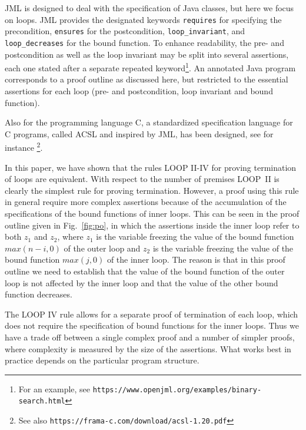 \documentclass[runningheads]{llncs}       %
\begin{document}
JML is designed to deal with the specification of Java classes,
but here we focus on loops.
JML provides the designated keywords 
\texttt{requires} for specifying the precondition,
\texttt{ensures} for the postcondition,
\texttt{loop\_invariant}, and 
\texttt{loop\_decreases} for the bound function.
To enhance readability, the pre- and postcondition as well as the loop invariant may be split into several
assertions, each one stated after a separate repeated keyword\footnote{For an example, see 
       \texttt{https://www.openjml.org/examples/binary-search.html}}.
An annotated Java program corresponds to a proof outline as discussed here,
but restricted to the essential assertions for each loop (pre- and postcondition,
loop invariant and bound function).

Also for the programming language C, a standardized specification language for C programs, 
called ACSL and inspired by JML, has been designed, see for instance
\cite{BBBCKKMPPS21}\footnote{See also
       \texttt{https://frama-c.com/download/acsl-1.20.pdf}}.


\medskip

In this paper, we have shown that  the rules LOOP II-IV 
for proving termination of loops are equivalent.
With respect to the number of premises LOOP~II is clearly
the simplest rule for proving termination.
However,  a proof using this rule in general require more
complex assertions because of the accumulation of the
specifications of the bound functions of  inner loops.
This can be seen in the proof outline given in Fig.~\ref{fig:po}, 
in which the assertions inside the inner loop refer to both $z_1$ and $z_2$,
where $z_1$ is the variable freezing the value of the bound function $max(n-i,0)$ of the outer loop
and $z_2$ is the variable freezing the value of the bound function $max(j,0)$ of the inner loop.
The reason is that in this proof outline we need to establish 
that the value of the bound function of the outer loop is not affected 
by the inner loop and that the value of the other bound function decreases.

The LOOP IV rule allows for a separate proof of termination of each
loop, which does not require the specification of bound functions for
the inner loops.  Thus we have a trade off between a single complex
proof and a number of simpler proofs, where complexity is measured by
the size of the assertions.  What works best in practice depends on
the particular program structure.
\end{document}
